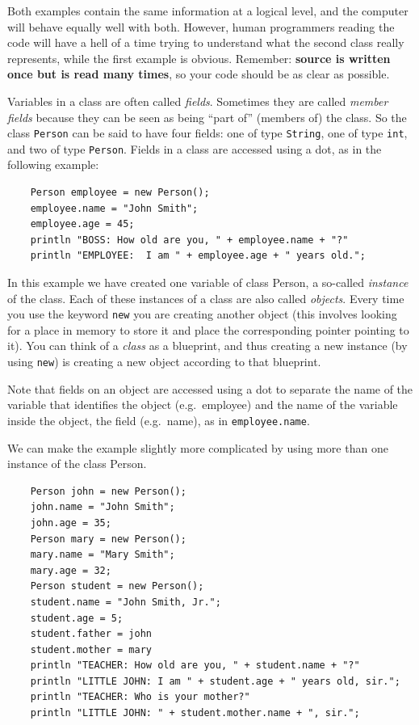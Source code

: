 Both examples contain the same information at a logical level, and the
computer will behave equally well with both. However, human
programmers reading the code will have a hell of a time trying to
understand what the second class really represents, while the first
example is obvious. Remember: \textbf{source is written once but is read many
times}, so your code should be as clear as possible.

Variables in a class are often called \emph{fields}. Sometimes they
are called \emph{member fields} because they can be seen as being
``part of'' (members of) the class. So the class \verb+Person+ can be
said to have four fields: one of type \verb+String+, one of type
\verb+int+, and two of type \verb+Person+. Fields in a class are
accessed using a dot, as in the following example: 

\begin{verbatim}
    Person employee = new Person();
    employee.name = "John Smith";
    employee.age = 45;
    println "BOSS: How old are you, " + employee.name + "?"
    println "EMPLOYEE:  I am " + employee.age + " years old.";
\end{verbatim}

In this example we have created one variable of class Person, a
so-called 
\emph{instance} of the class. Each of these instances of a class
are also called \emph{objects}. Every time you use the
keyword \verb+new+ you are creating another object (this involves
looking for a place in memory to store it and place the corresponding
pointer pointing to it). You can think of a \emph{class} as a
blueprint, and thus creating a new instance (by using \verb+new+) 
is creating a new object according to that blueprint. 

Note that fields on an object are accessed using a dot to
separate the name of the variable that identifies the object
(e.g.~employee) and the name of the variable inside the object, the
field (e.g.~name), as in \verb+employee.name+.

We can make the example slightly more complicated by using more than
one instance of the class Person. 

\begin{verbatim}
    Person john = new Person();
    john.name = "John Smith";
    john.age = 35;
    Person mary = new Person();
    mary.name = "Mary Smith";
    mary.age = 32;
    Person student = new Person();
    student.name = "John Smith, Jr.";
    student.age = 5;
    student.father = john
    student.mother = mary
    println "TEACHER: How old are you, " + student.name + "?"
    println "LITTLE JOHN: I am " + student.age + " years old, sir.";
    println "TEACHER: Who is your mother?"
    println "LITTLE JOHN: " + student.mother.name + ", sir.";
\end{verbatim}

